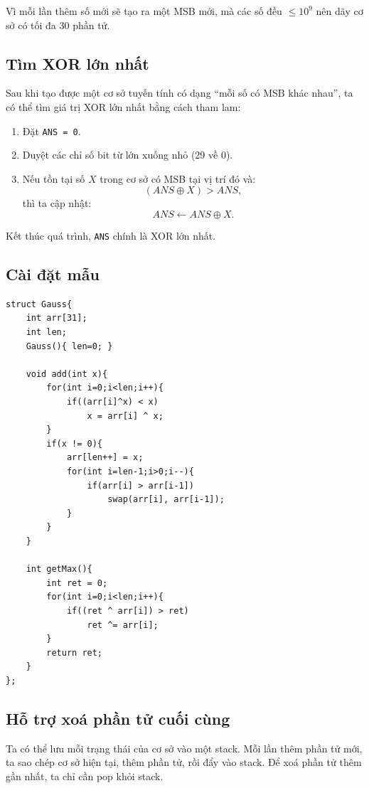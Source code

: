 Vì mỗi lần thêm số mới sẽ tạo ra một MSB mới, mà các số đều $\le 10^9$ nên dãy cơ sở có tối đa 30 phần tử.

\subsection*{Tìm XOR lớn nhất}

Sau khi tạo được một cơ sở tuyến tính có dạng “mỗi số có MSB khác nhau”, ta có thể tìm giá trị XOR lớn nhất bằng cách tham lam:

\begin{enumerate}
    \item Đặt \texttt{ANS = 0}.
    \item Duyệt các chỉ số bit từ lớn xuống nhỏ (29 về 0).
    \item Nếu tồn tại số $X$ trong cơ sở có MSB tại vị trí đó và:
    \[
    (ANS \oplus X) > ANS,
    \]
    thì ta cập nhật:
    \[
    ANS \leftarrow ANS \oplus X.
    \]
\end{enumerate}

Kết thúc quá trình, \texttt{ANS} chính là XOR lớn nhất.

\subsection*{Cài đặt mẫu}

\begin{verbatim}
struct Gauss{
    int arr[31];
    int len;
    Gauss(){ len=0; }

    void add(int x){
        for(int i=0;i<len;i++){
            if((arr[i]^x) < x)
                x = arr[i] ^ x;
        }
        if(x != 0){
            arr[len++] = x;
            for(int i=len-1;i>0;i--){
                if(arr[i] > arr[i-1])
                    swap(arr[i], arr[i-1]);
            }
        }
    }

    int getMax(){
        int ret = 0;
        for(int i=0;i<len;i++){
            if((ret ^ arr[i]) > ret)
                ret ^= arr[i];
        }
        return ret;
    }
};
\end{verbatim}

\subsection*{Hỗ trợ xoá phần tử cuối cùng}

Ta có thể lưu mỗi trạng thái của cơ sở vào một stack.  
Mỗi lần thêm phần tử mới, ta sao chép cơ sở hiện tại, thêm phần tử, rồi đẩy vào stack.  
Để xoá phần tử thêm gần nhất, ta chỉ cần pop khỏi stack.

